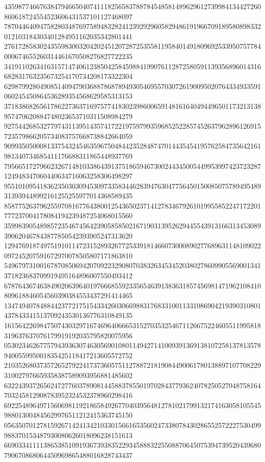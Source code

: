 \begin{DoxyCode}
      435987746676384794665040741118256583788784548581489629612739984134427260860618724554523606431537101127468097
      787044640947582803487697589483282412392929605829486191966709189580898332012103184303401284951162035342801441
      276172858302435598300320420245120728725355811958401491809692533950757784000674655260314461670508276827722235
      341911026341631571474061238504258459884199076112872580591139356896014316682831763235673254170734208173322304
      629879928049085140947903688786878949305469557030726190095020764334933591060245450864536289354568629585313153
      371838682656178622736371697577418302398600659148161640494496501173213138957470620884748023653710311508984279
      927544268532779743113951435741722197597993596852522857452637962896126915723579866205734083757668738842664059
      909935050008133754324546359675048442352848747014435454195762584735642161981340734685411176688311865448937769
      795665172796623267148103386439137518659467300244345005449953997423723287124948347060440634716063258306498297
      955101095418362350303094530973358344628394763047756450150085075789495489313939448992161255255977014368589435
      858775263796255970816776438001254365023714127834679261019955852247172201777237004178084194239487254068015560
      359983905489857235467456423905858502167190313952629445543913166313453089390620467843877850542393905247313620
      129476918749751910114723152893267725339181466073000890277689631148109022097245207591672970078505807171863810
      549679731001678708506942070922329080703832634534520380278609905569001341371823683709919495164896007550493412
      678764367463849020639640197666855923356546391383631857456981471962108410809618846054560390384553437291414465
      134749407848844237721751543342603066988317683310011331086904219390310801437843341513709243530136776310849135
      161564226984750743032971674696406665315270353254671126675224605511995818319637637076179919192035795820075956
      053023462677579439363074630569010801149427141009391369138107258137813578940055995001835425118417213605572752
      210352680373572652792241737360575112788721819084490061780138897107708229310027976659358387589093956881485602
      632243937265624727760378908144588378550197028437793624078250527048758164703245812908783952324532378960298416
      692254896497156069811921865849267704039564812781021799132174163058105545988013004845629976511212415363745150
      056350701278159267142413421033015661653560247338078430286552572227530499988370153487930080626018096238151613
      669033411113865385109193673938352293458883225508870645075394739520439680790670868064450969865488016828743437

\end{DoxyCode}

